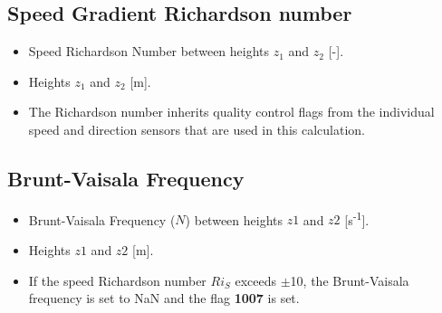 \subsection{Speed Gradient Richardson number}
\begin{itemize}
\item {} Speed Richardson Number between heights $z_1$ and $z_2$ [-].
\item {} Heights $z_1$ and $z_2$ [m].
\item {} The Richardson number inherits quality control flags from the individual speed and direction sensors that are used in this calculation. 
\end{itemize}

\subsection{Brunt-Vaisala Frequency}
\begin{itemize}
\item {} Brunt-Vaisala Frequency ($N$) between heights $z1$ and $z2$ [s\textsuperscript{-1}]. 
\item {} Heights $z1$ and $z2$ [m].
\item {} If the speed Richardson number $Ri_S$ exceeds $\pm$10, the Brunt-Vaisala frequency is set to NaN and the flag \textbf{1007} is set.
\end{itemize}

